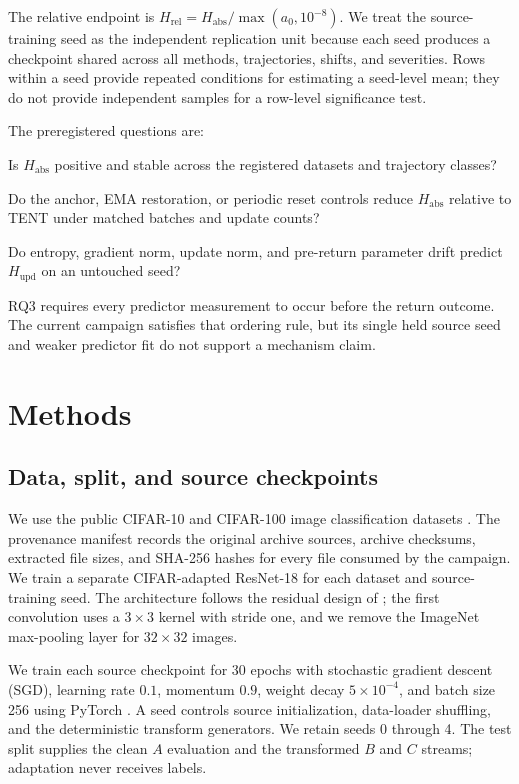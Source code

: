 \documentclass[11pt]{article}
\newcommand{\Habs}{\ensuremath{H_{\mathrm{abs}}}}
\newcommand{\Hupd}{\ensuremath{H_{\mathrm{upd}}}}
\newcommand{\Hrel}{\ensuremath{H_{\mathrm{rel}}}}
\newcommand{\A}{\ensuremath{A}}
\newcommand{\B}{\ensuremath{B}}
\newcommand{\C}{\ensuremath{C}}
\begin{document}
The relative endpoint is $\Hrel=\Habs/\max(a_0,10^{-8})$. We treat the source-training seed as the independent replication unit because each seed produces a checkpoint shared across all methods, trajectories, shifts, and severities. Rows within a seed provide repeated conditions for estimating a seed-level mean; they do not provide independent samples for a row-level significance test.

The preregistered questions are:
\begin{description}[leftmargin=1.6em,style=nextline]
    \item[RQ1:] Is $\Habs$ positive and stable across the registered datasets and trajectory classes?
    \item[RQ2:] Do the anchor, EMA restoration, or periodic reset controls reduce $\Habs$ relative to TENT under matched batches and update counts?
    \item[RQ3:] Do entropy, gradient norm, update norm, and pre-return parameter drift predict $\Hupd$ on an untouched seed?
\end{description}
RQ3 requires every predictor measurement to occur before the return outcome. The current campaign satisfies that ordering rule, but its single held source seed and weaker predictor fit do not support a mechanism claim.

\section{Methods}
\label{sec:methods}

\subsection{Data, split, and source checkpoints}
\label{sec:data}

 We use the public CIFAR-10 and CIFAR-100 image classification datasets \citep{cifar}. The provenance manifest records the original archive sources, archive checksums, extracted file sizes, and SHA-256 hashes for every file consumed by the campaign. We train a separate CIFAR-adapted ResNet-18 for each dataset and source-training seed. The architecture follows the residual design of \citet{resnet}; the first convolution uses a $3\times3$ kernel with stride one, and we remove the ImageNet max-pooling layer for $32\times32$ images.

We train each source checkpoint for 30 epochs with stochastic gradient descent (SGD), learning rate $0.1$, momentum $0.9$, weight decay $5\times10^{-4}$, and batch size 256 using PyTorch \citep{pytorch}. A seed controls source initialization, data-loader shuffling, and the deterministic transform generators. We retain seeds 0 through 4. The test split supplies the clean $\A$ evaluation and the transformed $\B$ and $\C$ streams; adaptation never receives labels.
\end{document}
